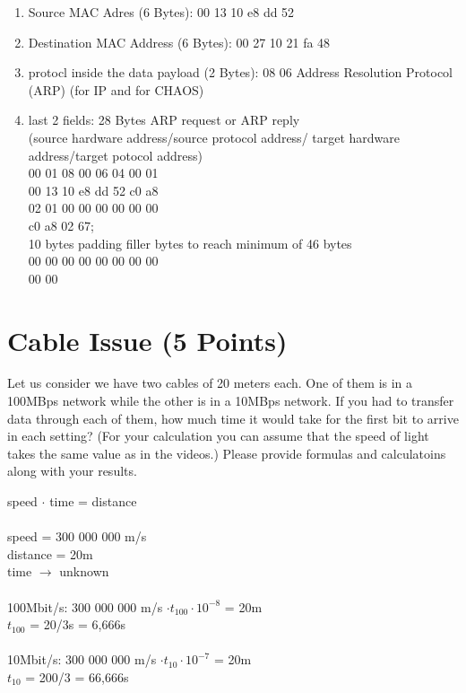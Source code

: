 \documentclass{WeSTassignment}
\begin{document}
\begin{enumerate}
\item Source MAC Adres (6 Bytes): 00 13 10 e8 dd 52
\item Destination MAC Address (6 Bytes): 00 27 10 21 fa 48
\item protocl inside the data payload (2 Bytes): 08 06 \rightarrow Address Resolution Protocol (ARP) (for IP and for CHAOS)
\item last 2 fields:
28 Bytes ARP request or ARP reply\\
(source hardware address/source protocol address/ target hardware address/target potocol address)\\
00 01 08 00 06 04 00 01\\
00 13 10 e8 dd 52 c0 a8\\
02 01 00 00 00 00 00 00\\
c0 a8 02 67;\\
10 bytes padding \rightarrow filler bytes to reach minimum of 46 bytes\\
00 00 00 00 00 00 00 00\\
00 00\\
\end{enumerate}




\section{Cable Issue (5 Points)}

Let us consider we have two cables of 20 meters each. One of them is in a 100MBps network while the other is in a 10MBps network. If you had to transfer data through each of them, how much time it would take for the first bit to arrive in each setting? (For your calculation you can assume that the speed of light takes the same value as in the videos.) Please provide formulas and calculatoins along with your results. 

speed $\cdot$ time = distance\\
\\
speed = 300 000 000 m/s\\
distance = 20m\\
time $\rightarrow$ unknown\\
\\
100Mbit/s:
300 000 000 m/s $\cdot t_{100} \cdot 10^{-8}$ = 20m\\
$t_{100}$ = 20/3s = 6,666s\\
\\
10Mbit/s:
300 000 000 m/s $\cdot t_{10} \cdot 10^{-7}$ = 20m\\
$t_{10}$ = 200/3 = 66,666s
\end{document}
